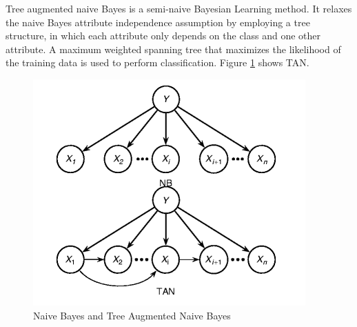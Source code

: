 Tree augmented naive Bayes is a semi-naive Bayesian Learning method. It relaxes the naive Bayes attribute independence assumption by employing a tree structure, in which each attribute only depends on the class and one other attribute. A maximum weighted spanning tree that maximizes the likelihood of the training data is used to perform classification. Figure \ref{fig:tan} shows TAN.

\begin{figure}[H]
	\centering
	\includegraphics[width=0.4\linewidth]{sections/imgs/techniques/tan.png}
	\caption{Naive Bayes and Tree Augmented Naive Bayes\cite{tan}}
	\label{fig:tan}
\end{figure}




